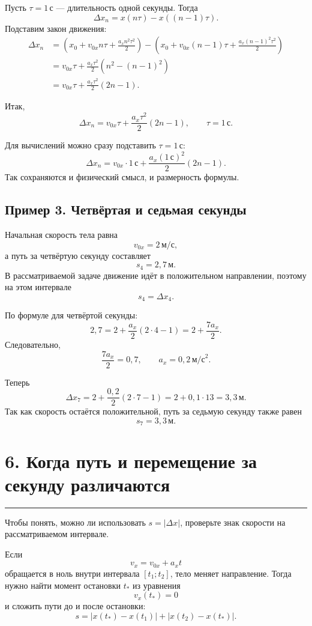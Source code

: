 \documentclass[a4paper,12pt]{article}
\newcommand{\sectionline}{%
  \vspace{0.1em}
  \noindent\textcolor{accent}{\rule{\linewidth}{0.5pt}}
  \vspace{0.45em}
}
\newcommand{\ms}{\,\text{м/с}}
\newcommand{\mss}{\,\text{м/с}^{2}}
\newcommand{\metre}{\,\text{м}}
\newcommand{\second}{\,\text{с}}
\begin{document}
Пусть $\tau=1\second$ --- длительность одной секунды. Тогда
\[
  \Delta x_n=x(n\tau)-x((n-1)\tau).
\]
Подставим закон движения:
\begin{align*}
\Delta x_n
&=
\left(
  x_0+v_{0x}n\tau+\frac{a_xn^2\tau^2}{2}
\right)
-
\left(
  x_0+v_{0x}(n-1)\tau+
  \frac{a_x(n-1)^2\tau^2}{2}
\right)
\\[1mm]
&=v_{0x}\tau+
\frac{a_x\tau^2}{2}
\left(n^2-(n-1)^2\right)
\\[1mm]
&=v_{0x}\tau+
\frac{a_x\tau^2}{2}(2n-1).
\end{align*}

Итак,
\[
\boxed{
\Delta x_n=
 v_{0x}\tau+
 \frac{a_x\tau^2}{2}(2n-1),
\qquad \tau=1\second.
}
\]

Для вычислений можно сразу подставить $\tau=1\second$:
\[
\boxed{
\Delta x_n=
 v_{0x}\cdot 1\second+
 \frac{a_x(1\second)^2}{2}(2n-1).
}
\]
Так сохраняются и физический смысл, и размерность формулы.

\subsection*{Пример 3. Четвёртая и седьмая секунды}

Начальная скорость тела равна
\[
  v_{0x}=2\ms,
\]
а путь за четвёртую секунду составляет
\[
  s_4=2{,}7\metre.
\]
В рассматриваемой задаче движение идёт в положительном направлении, поэтому на этом интервале
\[
  s_4=\Delta x_4.
\]

По формуле для четвёртой секунды:
\[
  2{,}7=2+\frac{a_x}{2}(2\cdot4-1)
  =2+\frac{7a_x}{2}.
\]
Следовательно,
\[
  \frac{7a_x}{2}=0{,}7,
  \qquad
  a_x=0{,}2\mss.
\]

Теперь
\[
  \Delta x_7=
  2+\frac{0{,}2}{2}(2\cdot7-1)
  =2+0{,}1\cdot13
  =3{,}3\metre.
\]
Так как скорость остаётся положительной, путь за седьмую секунду также равен
\[
  \boxed{s_7=3{,}3\metre.}
\]

\section*{6. Когда путь и перемещение за секунду различаются}
\sectionline

Чтобы понять, можно ли использовать $s=|\Delta x|$, проверьте знак скорости на рассматриваемом интервале.

Если
\[
  v_x=v_{0x}+a_xt
\]
обращается в ноль внутри интервала $[t_1;t_2]$, тело меняет направление. Тогда нужно найти момент остановки $t_*$ из уравнения
\[
  v_x(t_*)=0
\]
и сложить пути до и после остановки:
\[
\boxed{
  s=|x(t_*)-x(t_1)|+|x(t_2)-x(t_*)|.
}
\]
\end{document}
